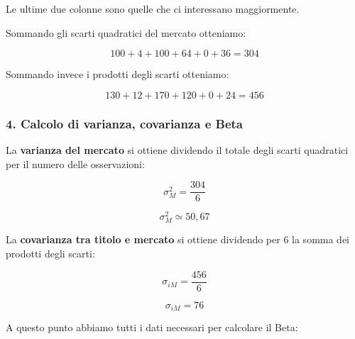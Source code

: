 \begin{center}
\end{center}

\noindent Le ultime due colonne
sono quelle che ci interessano maggiormente.

\medskip

\noindent Sommando gli scarti quadratici
del mercato otteniamo:

\[
100+4+100+64+0+36=\boxed{304}
\]

\noindent Sommando invece i prodotti
degli scarti otteniamo:

\[
130+12+170+120+0+24=\boxed{456}
\]


\subsubsection*{4. Calcolo di varianza, covarianza e Beta}

\noindent La \textbf{varianza del mercato}
si ottiene dividendo il totale
degli scarti quadratici per il numero
delle osservazioni:

\[
\sigma_M^2=\frac{304}{6}
\]

\[
\boxed{\sigma_M^2\simeq50{,}67}
\]

\noindent La \textbf{covarianza tra titolo e mercato}
si ottiene dividendo per 6 la somma
dei prodotti degli scarti:

\[
\sigma_{iM}=\frac{456}{6}
\]

\[
\boxed{\sigma_{iM}=76}
\]

\noindent A questo punto abbiamo
tutti i dati necessari per calcolare il Beta:

